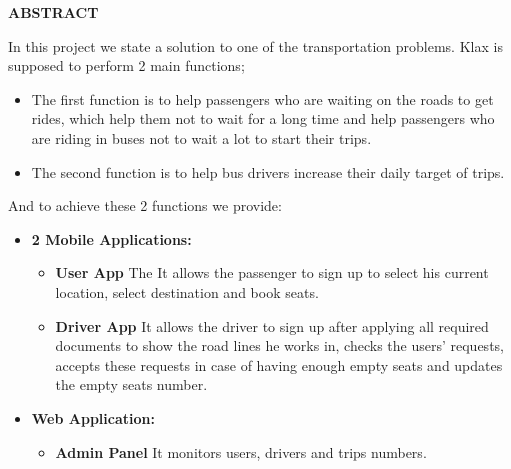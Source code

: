 \begin{titlepage}

\begin{center}
    \Large
    \vspace{0.9cm}
    \textbf{ABSTRACT}
    \end{center}
\hspace{2cm} In this project we state a solution to one of the transportation problems. \newline
Klax is supposed to perform 2 main functions;
     \begin{itemize}
         \item The first function is to help passengers who are waiting on the roads to get rides, which help them not to wait for a long time and help passengers who are riding in buses not to wait a lot to start their trips.
         \item The second function is to help bus drivers increase their daily target of trips.
     \end{itemize}
     
     And to achieve these 2 functions we provide:
     \begin{itemize}
         \item {\textbf{2 Mobile Applications:}}
         \begin{itemize}
             \item {\textbf{User App}}
             \newline The It allows the passenger to sign up to select his current location, select destination and book seats.
             
              \item {\textbf{Driver App}}
             \newline It allows the driver to sign up after applying all required documents to show the road lines he works in, checks the users' requests, accepts these requests in case of having enough empty seats and updates the empty seats number.
         \end{itemize}
          
         \item {\textbf{Web Application:}}
          \begin{itemize}
              \item {\textbf{Admin Panel}}
              \newline It monitors users, drivers and trips numbers.
          \end{itemize} 
     \end{itemize}
\end{titlepage}
